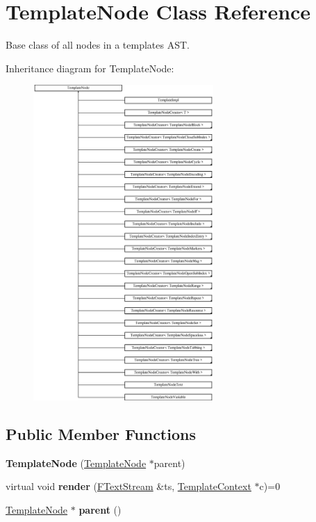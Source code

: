 \hypertarget{class_template_node}{}\section{Template\+Node Class Reference}
\label{class_template_node}


Base class of all nodes in a template\textquotesingle{}s A\+ST.  


Inheritance diagram for Template\+Node\+:\begin{figure}[H]
\begin{center}
\leavevmode
\includegraphics[height=12.000000cm]{class_template_node}
\end{center}
\end{figure}
\subsection*{Public Member Functions}
\begin{DoxyCompactItemize}
\item 
\mbox{\label{class_template_node_a8bdf67203f3fc13e54922d53a381d310}} 
{\bfseries Template\+Node} (\mbox{\hyperlink{class_template_node}{Template\+Node}} $\ast$parent)
\item 
\mbox{\label{class_template_node_adb2714489a8bb9aee4fc97c0d16eb6f4}} 
virtual void {\bfseries render} (\mbox{\hyperlink{class_f_text_stream}{F\+Text\+Stream}} \&ts, \mbox{\hyperlink{class_template_context}{Template\+Context}} $\ast$c)=0
\item 
\mbox{\label{class_template_node_a69a306ef84e62af9fe57bf9aacc94536}} 
\mbox{\hyperlink{class_template_node}{Template\+Node}} $\ast$ {\bfseries parent} ()
\end{DoxyCompactItemize}


